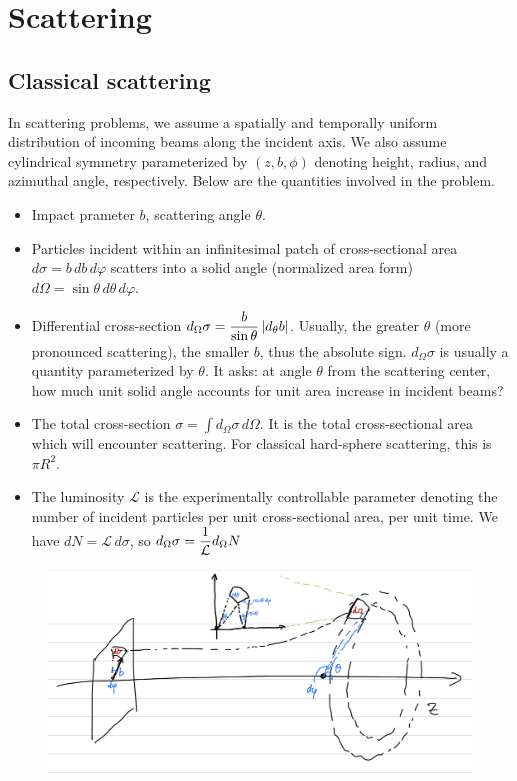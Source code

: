 \section{Scattering}
\subsection{Classical scattering}
In scattering problems, we assume a spatially and temporally uniform distribution of 
incoming beams along the incident axis. We also assume cylindrical 
symmetry parameterized by $(z, b, \phi)$ denoting height, radius, and 
azimuthal angle, respectively. Below are the quantities involved 
in the problem. 
\begin{itemize}
    \item Impact prameter $b$, scattering angle $\theta$.
    \item Particles incident within an infinitesimal patch 
    of cross-sectional area $d\sigma = b\, db\, d\varphi$ scatters into a 
    solid angle (normalized area form) $d\Omega = \sin\theta \, d\theta\, d\varphi$. 
    \item Differential cross-section 
    $d_\Omega \sigma = \dfrac b {\sin\theta}\left|d_\theta b \right|$. 
    Usually, the greater $\theta$ (more pronounced scattering), the smaller $b$, thus 
    the absolute sign. $d_\Omega \sigma$ is usually a 
    quantity parameterized by $\theta$. It asks: at angle $\theta$ 
    from the scattering center, how much unit solid angle accounts 
    for unit area increase in incident beams? 
    \item The total cross-section $\sigma = \int d_\Omega \sigma\, d\Omega$. It is 
    the total cross-sectional area which will encounter scattering. For classical hard-sphere 
    scattering, this is $\pi R^2$. 
    \item The luminosity $\mathcal L$ is the experimentally controllable 
    parameter denoting the number of incident particles 
    per unit cross-sectional area, per unit time. We have 
    $dN = \mathcal L\, d\sigma$, so 
    $d_\Omega\sigma = \dfrac 1 {\mathcal L} d_\Omega N$
\end{itemize}
\begin{figure}[h!] %
    \centering
    \includegraphics[width=1\linewidth]{src/scattering.jpeg}
    \label{fig:scattering}
\end{figure}



